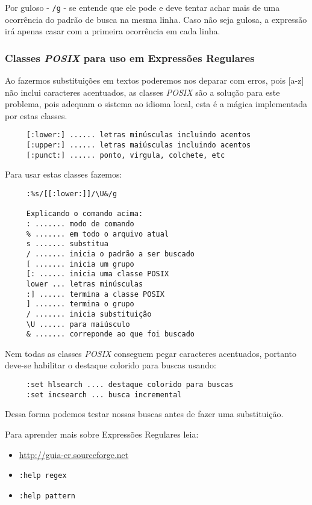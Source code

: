 Por guloso - \verb|/g| - se entende que ele pode e deve tentar achar mais de uma ocorrência
do padrão de busca na mesma linha. Caso não seja gulosa, a expressão irá apenas casar com a
primeira ocorrência em cada linha.

\subsubsection{Classes {\em POSIX} para uso em Expressões Regulares}

Ao fazermos substituições em textos poderemos nos deparar com
erros, pois [a-z] não inclui caracteres acentuados, as classes
{\em POSIX} são a solução para este problema, pois adequam o
sistema ao idioma local, esta é a mágica implementada por estas classes.

\begin{verbatim}
     [:lower:] ...... letras minúsculas incluindo acentos
     [:upper:] ...... letras maiúsculas incluindo acentos
     [:punct:] ...... ponto, virgula, colchete, etc
\end{verbatim}

Para usar estas classes fazemos:

\begin{verbatim}
     :%s/[[:lower:]]/\U&/g

     Explicando o comando acima:
     : ....... modo de comando
     % ....... em todo o arquivo atual
     s ....... substitua
     / ....... inicia o padrão a ser buscado
     [ ....... inicia um grupo
     [: ...... inicia uma classe POSIX
     lower ... letras minúsculas
     :] ...... termina a classe POSIX
     ] ....... termina o grupo
     / ....... inicia substituição
     \U ...... para maiúsculo
     & ....... correponde ao que foi buscado
\end{verbatim}

Nem todas as classes {\em POSIX} conseguem pegar caracteres
acentuados, portanto deve-se habilitar o destaque colorido para
buscas usando:

\begin{verbatim}
     :set hlsearch .... destaque colorido para buscas
     :set incsearch ... busca incremental
\end{verbatim}

Dessa forma podemos testar nossas buscas antes de fazer
uma substituição.


Para aprender mais sobre Expressões Regulares leia:

\begin{itemize}
  \item \url{http://guia-er.sourceforge.net}
  \item {\tt :help regex}
  \item {\tt :help pattern}
\end{itemize}

